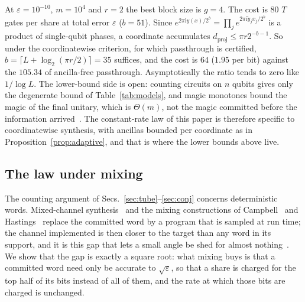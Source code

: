 \documentclass[aps,prx,twocolumn,superscriptaddress,nofootinbib,longbibliography]{revtex4-2}
\theoremstyle{plain}
\theoremstyle{definition}
\theoremstyle{remark}
\newcommand{\dproj}{d_{\mathrm{proj}}}
\begin{document}
At $\varepsilon=10^{-10}$, $m=10^4$ and $r=2$ the best block size is $g=4$. The cost is $80$ $T$ gates per share at total error $\varepsilon$ ($b=51$). Since $e^{2\pi\mathrm iy(x)/2^b}=\prod_je^{2\pi\mathrm i\tilde y_jx_j/2^b}$ is a product of single-qubit phases, a coordinate accumulates $\dproj\le\pi r2^{-b-1}$. So under the coordinatewise criterion, for which passthrough is certified, $b=\lceil L+\log_2(\pi r/2)\rceil=35$ suffices, and the cost is $64$ ($1.95$ per bit) against the $105.34$ of ancilla-free passthrough. Asymptotically the ratio tends to zero like $1/\log L$. The lower-bound side is open: counting circuits on $n$ qubits gives only the degenerate bound of Table~\ref{tab:models}, and magic monotones bound the magic of the final unitary, which is $\Theta(m)$, not the magic committed before the information arrived~\cite{BCHK,GKW}. The constant-rate law of this paper is therefore specific to coordinatewise synthesis, with ancillas bounded per coordinate as in Proposition~\ref{prop:adaptive}, and that is where the lower bounds above live.

\subsection{The law under mixing}\label{sec:mixing}

The counting argument of Secs.~\ref{sec:tube}--\ref{sec:conj} concerns deterministic words. Mixed-channel synthesis~\cite{KLMPP,Bothe} and the mixing constructions of Campbell~\cite{Campbell17} and Hastings~\cite{Hastings17} replace the committed word by a program that is sampled at run time; the channel implemented is then closer to the target than any word in its support, and it is this gap that lets a small angle be shed for almost nothing~\cite{Bothe}. We show that the gap is exactly a square root: what mixing buys is that a committed word need only be accurate to $\sqrt\varepsilon$, so that a share is charged for the top half of its bits instead of all of them, and the rate at which those bits are charged is unchanged.
\end{document}

